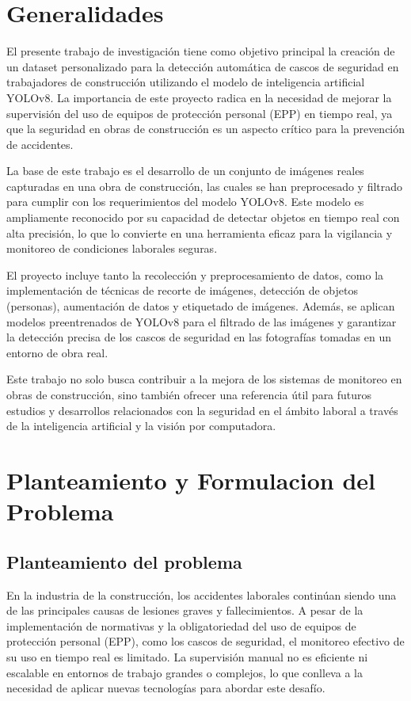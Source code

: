 \section{Generalidades}

El presente trabajo de investigación tiene como objetivo principal la creación de un dataset personalizado para la detección automática de cascos de seguridad en trabajadores de construcción utilizando el modelo de inteligencia artificial YOLOv8. La importancia de este proyecto radica en la necesidad de mejorar la supervisión del uso de equipos de protección personal (EPP) en tiempo real, ya que la seguridad en obras de construcción es un aspecto crítico para la prevención de accidentes.

La base de este trabajo es el desarrollo de un conjunto de imágenes reales capturadas en una obra de construcción, las cuales se han preprocesado y filtrado para cumplir con los requerimientos del modelo YOLOv8. Este modelo es ampliamente reconocido por su capacidad de detectar objetos en tiempo real con alta precisión, lo que lo convierte en una herramienta eficaz para la vigilancia y monitoreo de condiciones laborales seguras.

El proyecto incluye tanto la recolección y preprocesamiento de datos, como la implementación de técnicas de recorte de imágenes, detección de objetos (personas), aumentación de datos y etiquetado de imágenes. Además, se aplican modelos preentrenados de YOLOv8 para el filtrado de las imágenes y garantizar la detección precisa de los cascos de seguridad en las fotografías tomadas en un entorno de obra real.

Este trabajo no solo busca contribuir a la mejora de los sistemas de monitoreo en obras de construcción, sino también ofrecer una referencia útil para futuros estudios y desarrollos relacionados con la seguridad en el ámbito laboral a través de la inteligencia artificial y la visión por computadora.

\section{Planteamiento y Formulacion del Problema}

\subsection{Planteamiento del problema}

En la industria de la construcción, los accidentes laborales continúan siendo una de las principales causas de lesiones graves y fallecimientos. A pesar de la implementación de normativas y la obligatoriedad del uso de equipos de protección personal (EPP), como los cascos de seguridad, el monitoreo efectivo de su uso en tiempo real es limitado. La supervisión manual no es eficiente ni escalable en entornos de trabajo grandes o complejos, lo que conlleva a la necesidad de aplicar nuevas tecnologías para abordar este desafío.

